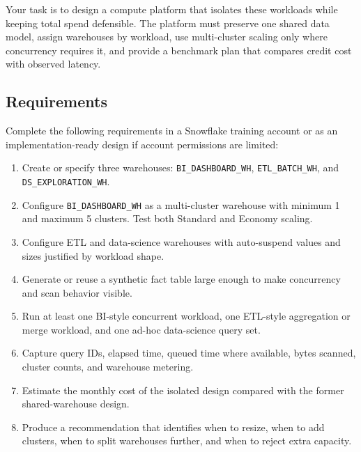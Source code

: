 Your task is to design a compute platform that isolates these workloads while keeping total spend defensible. The platform must preserve one shared data model, assign warehouses by workload, use multi-cluster scaling only where concurrency requires it, and provide a benchmark plan that compares credit cost with observed latency.

\subsection*{Requirements}
Complete the following requirements in a Snowflake training account or as an implementation-ready design if account permissions are limited:
\begin{enumerate}
    \item Create or specify three warehouses: \texttt{BI\_DASHBOARD\_WH}, \texttt{ETL\_BATCH\_WH}, and \texttt{DS\_EXPLORATION\_WH}.
    \item Configure \texttt{BI\_DASHBOARD\_WH} as a multi-cluster warehouse with minimum 1 and maximum 5 clusters. Test both Standard and Economy scaling.
    \item Configure ETL and data-science warehouses with auto-suspend values and sizes justified by workload shape.
    \item Generate or reuse a synthetic fact table large enough to make concurrency and scan behavior visible.
    \item Run at least one BI-style concurrent workload, one ETL-style aggregation or merge workload, and one ad-hoc data-science query set.
    \item Capture query IDs, elapsed time, queued time where available, bytes scanned, cluster counts, and warehouse metering.
    \item Estimate the monthly cost of the isolated design compared with the former shared-warehouse design.
    \item Produce a recommendation that identifies when to resize, when to add clusters, when to split warehouses further, and when to reject extra capacity.
\end{enumerate}

